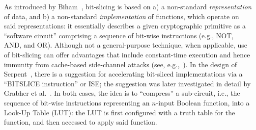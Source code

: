 
\cite{SCARV:Gutmann:00}
\cite{SCARV:WuWeaAus:01}
\cite{SCARV:TheSisPne:09}
\cite{SCARV:MTRGS:99}
\cite{SCARV:GGHJPTW:11}

\cite{SCARV:BarGioMar:09}
\cite{SCARV:RegIen:16}
\cite{SCARV:FazLopOli:18}

\cite{SCARV:GAST:05}
\cite{SCARV:GroKam:03,SCARV:FisLee:04}
\cite{SCARV:GKP:04}
\cite{SCARV:GroSav:04}

\cite{SCARV:TilGro:07}
\cite{SCARV:TilGro:06}

\cite{SCARV:KLWGSTW:06}

\cite{SCARV:FisLee:01,SCARV:FisLee:05,SCARV:FisLee:05}


\cite{SCARV:ShiLee:00,SCARV:YanLee:00,SCARV:McGLee:01,SCARV:ShiLee:02,SCARV:ShiYanLee:03,SCARV:LSYRR:04}


As introduced by Biham~\cite{SCARV:Biham:97}, bit-slicing is based on
a) a non-standard {\em representation} of data,
   and
b) a non-standard {\em implementation} of functions, which operate on
   said representations:
it essentially describes a given cryptographic primitive as a  ``software 
circuit'' comprising a sequence of bit-wise instructions (e.g., NOT, AND, 
and OR).  Although not a general-purpose technique, when applicable, use
of bit-slicing can offer advantages that include constant-time execution 
and hence immunity from cache-based side-channel attacks
(see, e.g.,~\cite{SCARV:KasSch:09}).
In the design of Serpent~\cite[Page 232]{SCARV:BihAndKnu:98}, there is a
suggestion for accelerating bit-sliced implementations via a ``BITSLICE 
instruction'' or ISE; the suggestion was later investigated in detail by 
Grabher et al.~\cite{SCARV:GraGroPag:08}.  In both cases, the idea is to 
``compress'' a sub-circuit, i.e., the sequence of bit-wise instructions 
representing an $n$-input Boolean function, into a Look-Up Table (LUT): 
the LUT is first configured with a truth table for the function, and then 
accessed to apply said function.  

